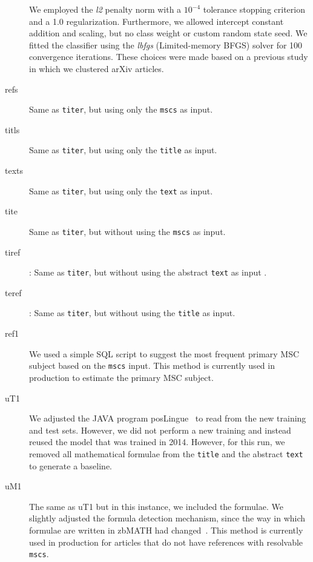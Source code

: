 \begin{description}
  We employed the \emph{l2} penalty norm with a \(10^{- 4}\) tolerance stopping criterion and a 1.0 regularization.
  Furthermore, we allowed intercept constant addition and scaling, but no class weight or custom random state seed.
  We fitted the classifier using the \emph{lbfgs} (Limited-memory BFGS) solver for 100 convergence iterations.
  These choices were made based on a previous study in which we clustered arXiv articles.
  \item[refs] Same as \texttt{titer}, but using only the \texttt{mscs} as input\footnotemark.
  \item[titls] Same as \texttt{titer}, but using only the \texttt{title} as input\footnotemark[\value{footnote}].
  \item[texts] Same as \texttt{titer}, but using only the \texttt{text} as input\footnotemark[\value{footnote}].
  \item[tite] Same as \texttt{titer}, but without using the \texttt{mscs} as input\footnotemark[\value{footnote}].
  \item[tiref]: Same as \texttt{titer}, but without using the abstract \texttt{text} as input \footnotemark[\value{footnote}].
  \item[teref]: Same as \texttt{titer}, but without using the \texttt{title} as input\footnotemark[\value{footnote}].
  \item[ref1] We used a simple SQL script to suggest the most frequent primary MSC subject based on the \texttt{mscs} input.
  This method is currently used in production to estimate the primary MSC subject.
  \item[uT1] 
  We adjusted the JAVA program posLingue~\cite{SchonebergS14} to read from the new training and test sets. However, we did not perform a new training and instead reused the model that was trained in 2014. However, for this run, we removed all mathematical formulae from the \texttt{title} and the abstract \texttt{text} to generate a baseline.
  \item[uM1]
  The same as uT1 but in this instance, we included the formulae.
  We slightly adjusted the formula detection mechanism, since the way in which formulae are written in zbMATH had changed~\cite{Schubotz2019b}.
  This method is currently used in production for articles that do not have references with resolvable \texttt{mscs}.
\end{description}

